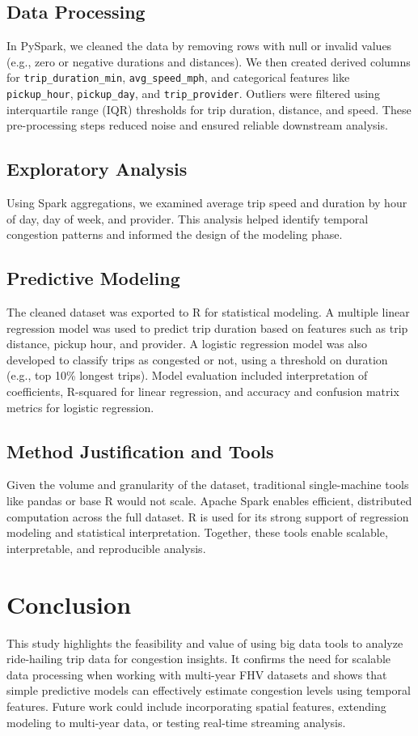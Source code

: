 \documentclass{article}
\begin{document}
\subsection{Data Processing}
In PySpark, we cleaned the data by removing rows with null or invalid values (e.g., zero or negative durations and distances). We then created derived columns for \texttt{trip\_duration\_min}, \texttt{avg\_speed\_mph}, and categorical features like \texttt{pickup\_hour}, \texttt{pickup\_day}, and \texttt{trip\_provider}. Outliers were filtered using interquartile range (IQR) thresholds for trip duration, distance, and speed. These pre-processing steps reduced noise and ensured reliable downstream analysis.

\subsection{Exploratory Analysis}
Using Spark aggregations, we examined average trip speed and duration by hour of day, day of week, and provider. This analysis helped identify temporal congestion patterns and informed the design of the modeling phase.

\subsection{Predictive Modeling}
The cleaned dataset was exported to R for statistical modeling. A multiple linear regression model was used to predict trip duration based on features such as trip distance, pickup hour, and provider. A logistic regression model was also developed to classify trips as congested or not, using a threshold on duration (e.g., top 10\% longest trips). Model evaluation included interpretation of coefficients, R-squared for linear regression, and accuracy and confusion matrix metrics for logistic regression.

\subsection{Method Justification and Tools}
Given the volume and granularity of the dataset, traditional single-machine tools like pandas or base R would not scale. Apache Spark enables efficient, distributed computation across the full dataset. R is used for its strong support of regression modeling and statistical interpretation. Together, these tools enable scalable, interpretable, and reproducible analysis.

\section{Conclusion}
This study highlights the feasibility and value of using big data tools to analyze ride-hailing trip data for congestion insights. It confirms the need for scalable data processing when working with multi-year FHV datasets and shows that simple predictive models can effectively estimate congestion levels using temporal features. Future work could include incorporating spatial features, extending modeling to multi-year data, or testing real-time streaming analysis.



\end{document}
